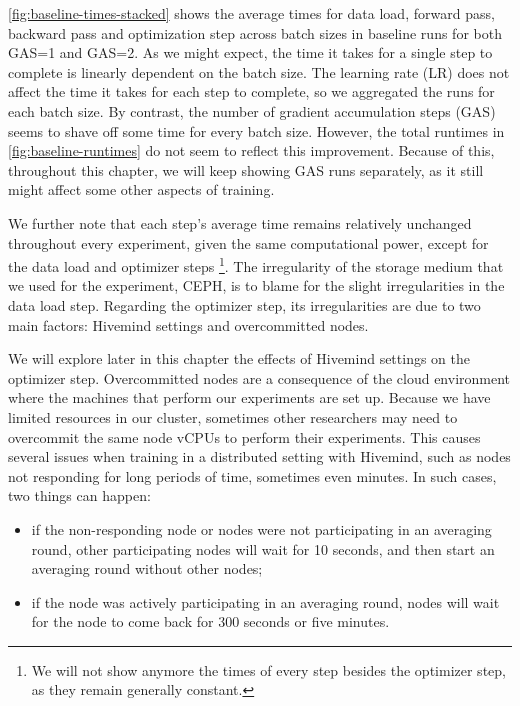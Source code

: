 \autoref{fig:baseline-times-stacked} shows the average times for data load, forward pass, backward pass and optimization step across batch sizes in baseline runs for both GAS=1 and GAS=2.
As we might expect, the time it takes for a single step to complete is linearly dependent on the batch size.
The learning rate (LR) does not affect the time it takes for each step to complete, so we aggregated the runs for each batch size.
By contrast, the number of gradient accumulation steps (GAS) seems to shave off some time for every batch size.
However, the total runtimes in \autoref{fig:baseline-runtimes} do not seem to reflect this improvement.
Because of this, throughout this chapter, we will keep showing GAS runs separately, as it still might affect some other aspects of training.

We further note that each step's average time remains relatively unchanged throughout every experiment, given the same computational power, except for the data load and optimizer steps
\footnote{We will not show anymore the times of every step besides the optimizer step, as they remain generally constant.}.
The irregularity of the storage medium that we used for the experiment, CEPH, is to blame for the slight irregularities in the data load step.
Regarding the optimizer step, its irregularities are due to two main factors: Hivemind settings and overcommitted nodes.

We will explore later in this chapter the effects of Hivemind settings on the optimizer step.
Overcommitted nodes are a consequence of the cloud environment where the machines that perform our experiments are set up.
Because we have limited resources in our cluster, sometimes other researchers may need to overcommit the same node vCPUs to perform their experiments.
This causes several issues when training in a distributed setting with Hivemind, such as nodes not responding for long periods of time, sometimes even minutes.
In such cases, two things can happen:

\begin{itemize}
    \item if the non-responding node or nodes were not participating in an averaging round, other participating nodes will wait for 10 seconds, and then start an averaging round without other nodes;
    \item if the node was actively participating in an averaging round, nodes will wait for the node to come back for 300 seconds or five minutes.
\end{itemize}

